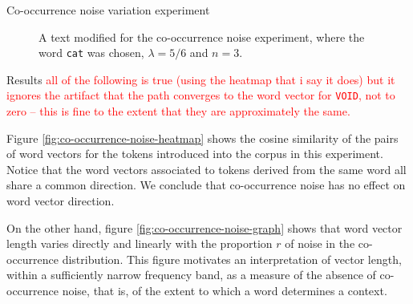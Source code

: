 \documentclass{article} %
\newcommand{\word}[1]{\texttt{#1}}
\begin{document}
\begin{section}{Co-occurrence noise variation experiment}
\begin{table}
	
	\label{fig:co-occurrence-noise-counts}
	\caption{Occurrence counts for words chosen for the co-occurrence noise experiment. }
	\label{cooccurrence-noise-words}
\end{table}

\begin{figure}
	\begin{mdframed}
	
	\end{mdframed}
	\caption{A text modified for the co-occurrence noise experiment, where the word \word{cat} was chosen, $\lambda = 5/6$ and $n=3$.}
	\label{fig:co-occurrence-noise-experiment-text}
\end{figure}

\begin{subsection}{Results}
	\textcolor{red}{all of the following is true (using the heatmap that i say it does) but it ignores the artifact that the path converges to the word vector for \word{VOID}, not to zero -- this is fine to the extent that they are approximately the same.}

Figure \ref{fig:co-occurrence-noise-heatmap} shows the cosine similarity of the pairs of word vectors for the tokens introduced into the corpus in this experiment.
Notice that the word vectors associated to tokens derived from the same word all share a common direction.
We conclude that co-occurrence noise has no effect on word vector direction.

On the other hand, figure \ref{fig:co-occurrence-noise-graph} shows that word vector length varies directly and linearly with the proportion $r$ of noise in the co-occurrence distribution.
This figure motivates an interpretation of vector length, within a sufficiently narrow frequency band, as a measure of the absence of co-occurrence noise, that is, of the extent to which a word determines a context.



\end{subsection}
\end{section}
\end{document}
